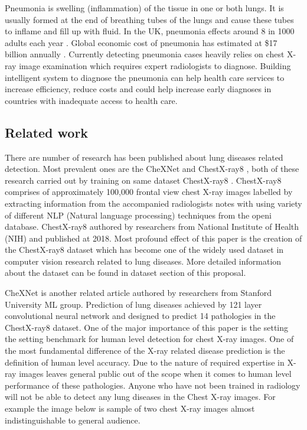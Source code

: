 \documentclass[12pt, twoside, a4paper]{article}
\begin{document}
Pneumonia is swelling (inflammation) of the tissue in one or both lungs. It is usually formed at the end of breathing tubes of the lungs and cause these tubes to inflame and fill up with fluid. In the UK, pneumonia effects around 8 in 1000 adults each year \cite{nhs}. Global economic cost of pneumonia has estimated at \$17 billion annually \cite{cost}. Currently detecting pneumonia cases heavily relies on chest X-ray image examination which requires expert radiologists to diagnose. Building intelligent system to diagnose the pneumonia can help  health care services to increase efficiency, reduce costs and could help increase early diagnoses in countries with inadequate access to health care.

\subsection{Related work}

There are number of research has been published about lung diseases related detection. Most prevalent ones are the CheXNet \cite{CheXNetRP} and ChestX-ray8 \cite{ChestX-ray8}, both of these research carried out by training on same dataset ChestX-ray8 \cite{ChestX-ray8}. ChestX-ray8 comprises of approximately 100,000 frontal view chest X-ray images labelled by extracting information from the accompanied radiologists notes with using variety of different NLP (Natural language processing) techniques from the openi\cite{openi} database. ChestX-ray8 authored by researchers from National Institute of Health (NIH) and published at 2018.
Most profound effect of this paper is the creation of the ChestX-ray8 dataset which has become one of the widely used dataset in computer vision research related to lung diseases. More detailed information about the dataset can be found in dataset section of this proposal. 

CheXNet is another related article authored by researchers from Stanford University ML group. Prediction of lung diseases achieved by 121 layer convolutional neural network and designed to predict 14 pathologies in the ChestX-ray8 dataset. One of the major importance of this paper is the setting the setting benchmark for human level detection for chest X-ray images. One of the most fundamental difference of the X-ray related disease prediction is the definition of human level accuracy. Due to the nature of required expertise in X-ray images leaves general public out of the scope when it comes to human level performance of these pathologies. Anyone who have not been trained in radiology will not be able to detect any lung diseases in the Chest X-ray images. For example the image below is sample of two chest X-ray images almost indistinguishable to general audience.
\end{document}
